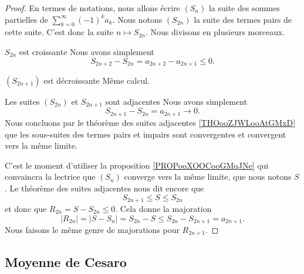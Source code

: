 \begin{proof}
    En termes de notations, nous allons écrire \( (S_n)\) la suite des sommes partielles de \( \sum_{k=0}^{\infty}(-1)^ka_k\). Nous notons \( (S_{2n})\) la suite des termes pairs de cette suite. C'est donc la suite \( n\mapsto S_{2n}\).
    Nous divisons en plusieurs morceaux.
    \begin{subproof}
        \item[\( S_{2n}\) est croissante]
            Nous avons simplement
            \begin{equation}
                S_{2n+2}-S_{2n}=a_{2n+2}-a_{2n+1}\leq 0.
            \end{equation}
        \item[\( (S_{2n+1})\) est décroissante]
            Même calcul.
        \item[Les suites \( (S_{2n})\) et \( S_{2n+1}\) sont adjacentes] Nous avons simplement
            \begin{equation}
                S_{2n+1}-S_{2n}=a_{2n+1}\to 0.
            \end{equation}
            Nous concluons par le théorème des suites adjacentes \ref{THOooZJWLooAtGMxD} que les sous-suites des termes pairs et impairs sont convergentes et convergent vers la même limite.
    \end{subproof}
    C'est le moment d'utiliser la proposition \ref{PROPooXOOCooGMqJNe} qui convaincra la lectrice que \( (S_n)\) converge vers la même limite, que nous notons \( S\). Le théorème des suites adjacentes nous dit encore que 
    \begin{equation}
        S_{2n+1}\leq S\leq S_{2n}
    \end{equation}
    et donc que \( R_{2n}=S-S_{2n}\leq 0\). Cela donne la majoration
    \begin{equation}
        | R_{2n} |=| S-S_n |=S_{2n}-S\leq S_{2n}-S_{2n+1}=a_{2n+1}.
    \end{equation}
    Nous faisons le même genre de majorations pour \( R_{2n+1}\).
\end{proof}

\subsection{Moyenne de Cesaro}

